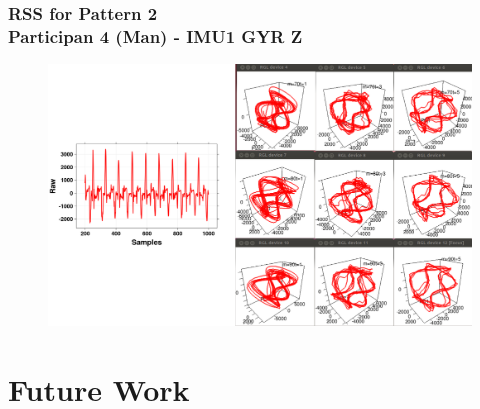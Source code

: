 \documentclass{beamer}
\begin{document}
\begin{frame}
\frametitle{RSS for Pattern 2 \\ Participan 4 (Man) - IMU1 GYR Z }
\vspace{-0.5cm}

\begin{figure}
\centering 
\includegraphics[scale=0.25]{man2} \\
\end{figure}

\end{frame}




\section{Future Work}
\end{document}
